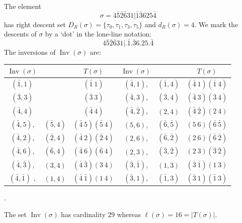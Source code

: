 \documentclass[Unicode]{cedram-alco}
\theoremstyle{definition}
\DeclareMathOperator{\invs}{Inv}
\begin{document}
\begin{ex}\label{ex:TypeB2} The element
$$
\sigma=4 \bar{5} \bar{2} \bar{6} 3 1 | \bar{1} \bar{3} 6 2 5 \bar{4}
$$
has right descent set $D_R(\sigma)=\{\tau_0,\tau_1,\tau_3,\tau_5\}$ and $d_R(\sigma)=4$. We mark the descents of $\sigma$ by a `dot' in the lone-line notation:
\begin{equation*}
4  \bar{5} \bar{2}  \bar{6} 3 1 | . \bar{1} . \bar{3} 6 . 2 5 . \bar{4}
\end{equation*}
The inversions of $\invs(\sigma)$ are:

\renewcommand{\arraystretch}{1.5}
\begin{center}
\begin{tabular}{|cc|c|cc|c|}
\hline
$\invs(\sigma)$&                    &$T(\sigma)$& $\invs(\sigma)$&         &$T(\sigma)$\\
\hline        
$(\bar{1}, 1)$       &                 &     $(\bar{1}\ 1)$             &$(\bar{4}, 1)$,       & $(\bar{1}, 4)$& $(\bar{4}\ 1)(\bar{1}\ 4)$\\
$(\bar{3}, 3)$       &                 &    $(\bar{3}\ 3) $           &$(\bar{4}, 3)$,       & $(\bar{3}, 4)$&$(\bar{4}\ 3)(\bar{3}\ 4)$ \\
$(\bar{4}, 4)$       &                 &   $ (\bar{4}\ 4)$             &$(\bar{4}, \bar{2})$, & $(2, 4)$& $(\bar{4}\ \bar{2})(2\ 4)$\\
$(\bar{4}, 5)$,       & $(\bar{5}, 4)$  & $(\bar{4}\ 5)(\bar{5}\ 4)$            & $(5, 6)$,             & $(\bar{6}, \bar{5})$&$(5\ 6)(\bar{6}\ \bar{5})$ \\
$(\bar{4}, 2)$,       & $(\bar{2}, 4)$ &  $(\bar{4}\ 2)(\bar{2}\ 4)$            & $(2, 6)$,             & $(\bar{6}, \bar{2})$&$(2\ 6)(\bar{6}\ \bar{2})$ \\
$(\bar{4}, 6)$,       & $(\bar{6}, 4)$ &   $(\bar{4}\ 6)(\bar{6}\ 4)$             & $(2, 3)$,             & $(\bar{3}, \bar{2})$&$(2\ 3)(\bar{3}\ \bar{2})$ \\
$(\bar{4}, \bar{3})$, & $(3, 4)$       &   $(\bar{4}\ \bar{3})(3\ 4)$               &$(\bar{3}, \bar{1})$, & $(1, 3)$&$(\bar{3}\ \bar{1})(1\ 3)$ \\
$(\bar{4}, \bar{1})$ ,& $(1, 4)$       &   $(\bar{4}\ \bar{1})(1\ 4)$                 & $(\bar{3}, 1)$,       & $(\bar{1}, 3)$&$(\bar{3}\ 1)(\bar{1}\ 3)$ \\
\hline
\end{tabular}.
\end{center}
The set $\invs(\sigma)$ has cardinality $29$ whereas $\ell(\sigma)=16=|T(\sigma)|$.  
\end{ex}
\end{document}
